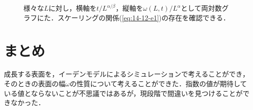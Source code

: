 \documentclass{jsarticle}
\begin{document}
\begin{enumerate}
\begin{enumerate}
\begin{figure}[H]
\begin{center}
                        \caption{様々な$L$に対し，横軸を$t/L^{\alpha/\beta}$，縦軸を$\omega(L,t)/L^{\alpha}$として両対数グラフにた．スケーリングの関係(\ref{eq:14-12-e1})の存在を確認できる．}
                        \label{fig:14-12-f5}
                    \end{center}
                \end{figure}
            \end{enumerate}
        
    \end{enumerate}

\section{まとめ}
    成長する表面を，イーデンモデルによるシミュレーションで考えることができ，そのときの表面の幅$\omega$の性質について考えることができた．指数の値が期待している値とならないことが不思議ではあるが，現段階で間違いを見つけることができなかった．
\nocite{textbook}
\nocite{fractal1}

\end{document}
